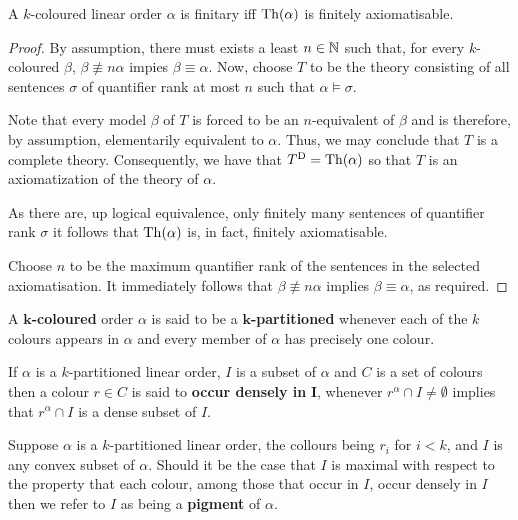 \begin{prp}
	A $k$-coloured linear order $\alpha$ is finitary iff $\operatorname{Th}(\alpha)$ is finitely axiomatisable.
\end{prp}
\begin{proof}
	\forward	By assumption, there must exists a least $n\in\mathbb{N}$ such that, for every $k$-coloured $\beta$, $\beta\nequiv{n}\alpha$ impies $\beta\equiv\alpha$.  Now, choose $T$ to be the theory consisting of all sentences $\sigma$ of quantifier rank at most $n$ such that $\alpha\models\sigma$.

	Note that every model $\beta$ of $T$ is forced to be an $n$-equivalent of $\beta$ and is therefore, by assumption, elementarily equivalent to $\alpha$.  Thus, we may conclude that $T$ is a complete theory.  Consequently, we have that ${T}^\mathrm{D}=\operatorname{Th}(\alpha)$ so that $T$ is an axiomatization of the theory of $\alpha$.

	As there are, up logical equivalence, only finitely many sentences of quantifier rank $\sigma$ it follows that $\operatorname{Th}(\alpha)$ is, in fact, finitely axiomatisable.

	\backward	Choose $n$ to be the maximum quantifier rank of the sentences in the selected axiomatisation.  It immediately follows that $\beta\nequiv{n}\alpha$ implies $\beta\equiv\alpha$, as required.
\end{proof}

\begin{dfn}
	A $\bm{k}$\textbf{-coloured} order $\alpha$ is said to be a $\bm{k}$\textbf{-partitioned} whenever each of the $k$ colours appears in $\alpha$ and every member of $\alpha$ has precisely one colour.
\end{dfn}

\begin{dfn}
	If $\alpha$ is a $k$-partitioned linear order, $I$ is a subset of $\alpha$ and $C$ is a set of colours then a colour $r\in C$ is said to \textbf{occur densely in }$\bm{I}$, whenever $r^\alpha\cap I\neq\emptyset$ implies that $r^\alpha\cap I$ is a dense subset of $I$.
\end{dfn}

\begin{dfn}[Pigment]
	Suppose $\alpha$ is a $k$-partitioned linear order, the collours being $r_i$ for $i<k$, and $I$ is any convex subset of $\alpha$.  Should it be the case that $I$ is maximal with respect to the property that each colour, among those that occur in $I$, occur densely in $I$ then we refer to $I$ as being a \textbf{pigment} of $\alpha$.
\end{dfn}


